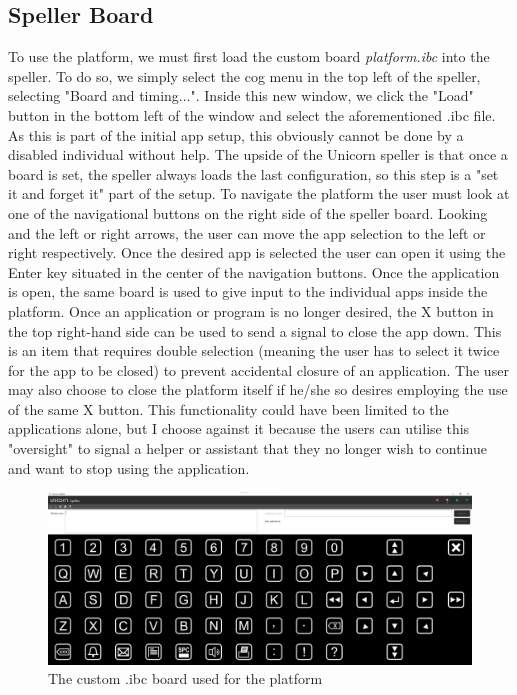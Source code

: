 \subsection{Speller Board}
 To use the platform, we must first load the custom board \textit{platform.ibc} into the speller. To do so, we simply select the cog menu in the top left of the speller, selecting "Board and timing...". Inside this new window, we click the "Load" button in the bottom left of the window and select the aforementioned .ibc file. As this is part of the initial app setup, this obviously cannot be done by a disabled individual without help. The upside of the Unicorn speller is that once a board is set, the speller always loads the last configuration, so this step is a "set it and forget it" part of the setup.
\vspace{\baselineskip}\newline
To navigate the platform the user must look at one of the navigational buttons on the right side of the speller board. Looking and the left or right arrows, the user can move the app selection to the left or right respectively. Once the desired app is selected the user can open it using the Enter key situated in the center of the navigation buttons. Once the application is open, the same board is used to give input to the individual apps inside the platform. Once an application or program is no longer desired, the X button in the top right-hand side can be used to send a signal to close the app down. This is an item that requires double selection (meaning the user has to select it twice for the app to be closed) to prevent accidental closure of an application. The user may also choose to close the platform itself if he/she so desires employing the use of the same X button. This functionality could have been limited to the applications alone, but I choose against it because the users can utilise this "oversight" to signal a helper or assistant that they no longer wish to continue and want to stop using the application.

\begin{figure}[H]
  \centering
  \includegraphics[width=1\textwidth]{Graphics/Platform Custom Board.png}
  \caption{The custom .ibc board used for the platform}
\end{figure}


